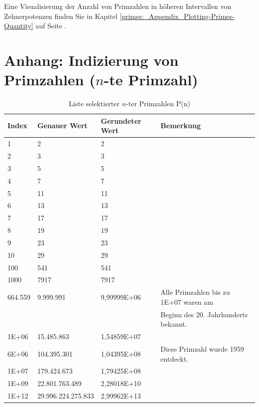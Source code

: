 \begin{refsegment}
Eine Visualisierung der Anzahl von Primzahlen in höheren Intervallen von
Zehnerpotenzen finden Sie in Kapitel \ref{primes:_Appendix_Plotting-Primes-Quantity}
auf Seite \pageref{primes:_Appendix_subsubsection_NumberofPrimes-in-intervals}.



\hypertarget{ntePrimzahl}{}
\section{Anhang: Indizierung von Primzahlen (\texorpdfstring{$n$}{n}-te Primzahl)}
\label{s:ntePrimzahl}

\begin{table}[ht]
\begin{center}
\begin{tabular}{|l|l|l|l|}\hline
Index   &   Genauer Wert  &       Gerundeter Wert &    Bemerkung \\
\hline \hline
1       &   2             &     2  & \\
2       &   3             &     3  &  \\
3       &   5             &     5  & \\
4       &   7             &     7  & \\
5       &   11            &     11 & \\
6       &   13            &     13 & \\
7       &   17            &     17 & \\
8       &   19            &     19 & \\
9       &   23            &     23 & \\
10      &   29            &     29 & \\
100     &   541           &     541 & \\
1000    &   7917          &     7917 & \\
664.559  &  9.999.991     &     9,99999E+06 & Alle Primzahlen bis zu 1E+07 waren am\\
         &                &                 & Beginn des 20. Jahrhunderts bekannt.\\
1E+06  &    15.485.863   &      1,54859E+07 & \\
6E+06  &    104.395.301    &    1,04395E+08  & Diese Primzahl wurde 1959 entdeckt.\\
1E+07  &    179.424.673     &    1,79425E+08 & \\
1E+09  &    22.801.763.489  &    2,28018E+10 & \\
1E+12  &    29.996.224.275.833 & 2,99962E+13 & \\ \hline
\end{tabular}
\caption{Liste selektierter $n$-ter Primzahlen P(n)}
\end{center}
\end{table}



\end{refsegment}
